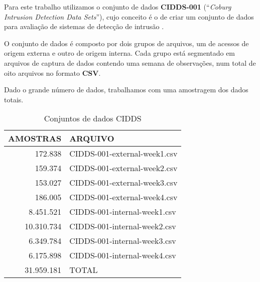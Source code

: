 \documentclass[twoside]{article}
\begin{document}
Para este trabalho utilizamos o conjunto de dados \textbf{CIDDS-001} (``\textit{Coburg Intrusion Detection Data Sets}''), cujo conceito é o de criar um conjunto de dados para avaliação de sistemas de detecção de intrusão \cite{ring2017creation,ring2017flow}.

O conjunto de dados é composto por dois grupos de arquivos, um de acessos de origem externa e outro de origem interna. Cada grupo está segmentado em arquivos de captura de dados contendo uma semana de observações, num total de oito arquivos no formato \textbf{CSV}.

Dado o grande número de dados, trabalhamos com uma amostragem dos dados totais.

\begin{table}\scriptsize
    \centering
    \begin{tabular}{rl}
        \toprule
        AMOSTRAS &  ARQUIVO \\
        \midrule
           172.838 & CIDDS-001-external-week1.csv \\
           159.374 & CIDDS-001-external-week2.csv \\
           153.027 & CIDDS-001-external-week3.csv \\
           186.005 & CIDDS-001-external-week4.csv \\
         8.451.521 & CIDDS-001-internal-week1.csv \\
        10.310.734 & CIDDS-001-internal-week2.csv \\
         6.349.784 & CIDDS-001-internal-week3.csv \\
         6.175.898 & CIDDS-001-internal-week4.csv \\
        31.959.181 & TOTAL \\
        \bottomrule
    \end{tabular}
    \caption{Conjuntos de dados CIDDS}
    \label{tab:tab:dataset}
\normalsize\end{table}
\end{document}
